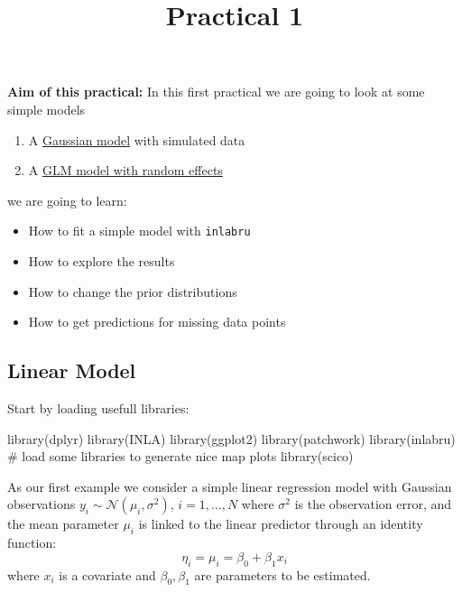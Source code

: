 \documentclass[
  letterpaper,
  DIV=11,
  numbers=noendperiod]{scrartcl}
\title{Practical 1}
\author{}
\date{}
\makeatletter
\newenvironment{Shaded}{\begin{snugshade}}{\end{snugshade}}
\newcommand{\CommentTok}[1]{\textcolor[rgb]{0.37,0.37,0.37}{#1}}
\newcommand{\FunctionTok}[1]{\textcolor[rgb]{0.28,0.35,0.67}{#1}}
\newcommand{\NormalTok}[1]{\textcolor[rgb]{0.00,0.23,0.31}{#1}}
\providecommand{\tightlist}{%
  \setlength{\itemsep}{0pt}\setlength{\parskip}{0pt}}\usepackage{longtable,booktabs,array}
\renewcommand{\maketitle}{\bgroup\setlength{\parindent}{0pt}
\begin{flushleft}
  {\sffamily\huge\textbf{\MakeUppercase{\@title}}} \vspace{0.3cm} \newline
  {\Large {\@subtitle}} \newline
  \@author
\end{flushleft}\egroup
}
\makeatother
\begin{document}
\maketitle

\pagestyle{mystyle}

\textbf{Aim of this practical:} In this first practical we are going to
look at some simple models

\begin{enumerate}
\def\labelenumi{\arabic{enumi}.}
\tightlist
\item
  A \hyperref[Gaussian-link]{Gaussian model} with simulated data
\item
  A \hyperref[GLM-link]{GLM model with random effects}
\end{enumerate}

we are going to learn:

\begin{itemize}
\tightlist
\item
  How to fit a simple model with \texttt{inlabru}
\item
  How to explore the results
\item
  How to change the prior distributions
\item
  How to get predictions for missing data points
\end{itemize}

\subsection{Linear Model}\label{sec-linmodel}

Start by loading usefull libraries:

\begin{Shaded}
\begin{Highlighting}[]
\FunctionTok{library}\NormalTok{(dplyr)}
\FunctionTok{library}\NormalTok{(INLA)}
\FunctionTok{library}\NormalTok{(ggplot2)}
\FunctionTok{library}\NormalTok{(patchwork)}
\FunctionTok{library}\NormalTok{(inlabru)     }
\CommentTok{\# load some libraries to generate nice map plots}
\FunctionTok{library}\NormalTok{(scico)}
\end{Highlighting}
\end{Shaded}

As our first example we consider a simple linear regression model with
Gaussian observations \(y_i\sim\mathcal{N}(\mu_i, \sigma^2)\),
\(i = 1,\dots,N\) where \(\sigma^2\) is the observation error, and the
mean parameter \(\mu_i\) is linked to the linear predictor through an
identity function: \[
\eta_i = \mu_i = \beta_0 + \beta_1 x_i
\] where \(x_i\) is a covariate and \(\beta_0, \beta_1\) are parameters
to be estimated.
\end{document}
